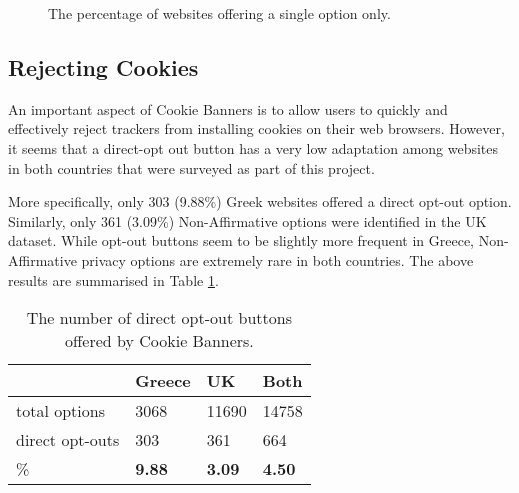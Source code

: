 \documentclass[../main.tex]{subfiles}
\begin{document}
\begin{figure}[ht]
    \centering
    \caption{The percentage of websites offering a single option only.}
    \label{fig:single_options}
\end{figure}

\subsection{Rejecting Cookies}

An important aspect of Cookie Banners is to allow users to quickly and effectively reject trackers from installing cookies on their web browsers. However, it seems that a direct-opt out button has a very low adaptation among websites in both countries that were surveyed as part of this project.

More specifically, only 303 (9.88\%) Greek websites offered a direct opt-out option. Similarly, only 361 (3.09\%) Non-Affirmative options were identified in the UK dataset. While opt-out buttons seem to be slightly more frequent in Greece, Non-Affirmative privacy options are extremely rare in both countries. The above results are summarised in Table \ref{tab:opt_outs}.

\begin{table}[ht]
    \centering
    \begin{tabular}{@{}llll@{}}
        \toprule
                              & Greece          & UK                & Both            \\ \midrule
        total options         & 3068            & 11690             & 14758           \\
        direct opt-outs & 303             & 361               & 664             \\
        \%                    & \textbf{9.88}  & \textbf{3.09}    & \textbf{4.50}  \\ \bottomrule
    \end{tabular}
    \caption{The number of direct opt-out buttons offered by Cookie Banners.}
    \label{tab:opt_outs}
\end{table}
\end{document}
